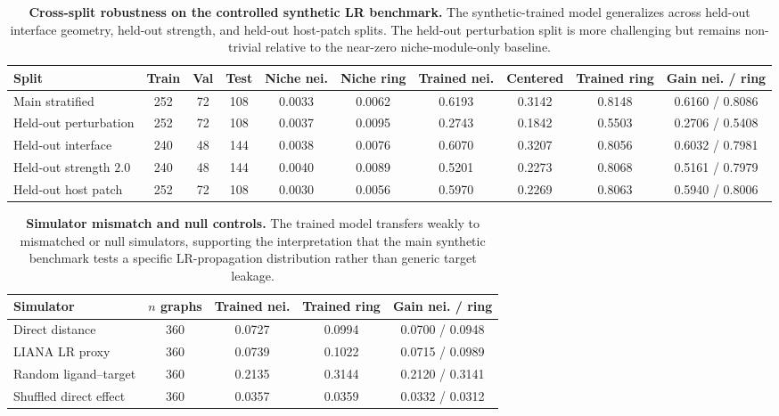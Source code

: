 \documentclass[sigconf,anonymous,review]{acmart}
\begin{document}
\begin{table}[t]
\centering
\small
\setlength{\tabcolsep}{4pt}
\renewcommand{\arraystretch}{1.08}
\caption{\textbf{Cross-split robustness on the controlled synthetic LR benchmark.}
The synthetic-trained model generalizes across held-out interface geometry, held-out
strength, and held-out host-patch splits. The held-out perturbation split is more
challenging but remains non-trivial relative to the near-zero niche-module-only baseline.}
\label{tab:synthetic_lr_cross_split}
\begin{tabular}{lccccccccc}
\toprule
Split & Train & Val & Test & Niche nei. & Niche ring & Trained nei. & Centered & Trained ring & Gain nei. / ring \\
\midrule
Main stratified & 252 & 72 & 108 & 0.0033 & 0.0062 & 0.6193 & 0.3142 & 0.8148 & 0.6160 / 0.8086 \\
Held-out perturbation & 252 & 72 & 108 & 0.0037 & 0.0095 & 0.2743 & 0.1842 & 0.5503 & 0.2706 / 0.5408 \\
Held-out interface & 240 & 48 & 144 & 0.0038 & 0.0076 & 0.6070 & 0.3207 & 0.8056 & 0.6032 / 0.7981 \\
Held-out strength $2.0$ & 240 & 48 & 144 & 0.0040 & 0.0089 & 0.5201 & 0.2273 & 0.8068 & 0.5161 / 0.7979 \\
Held-out host patch & 252 & 72 & 108 & 0.0030 & 0.0056 & 0.5970 & 0.2269 & 0.8063 & 0.5940 / 0.8006 \\
\bottomrule
\end{tabular}
\end{table}

\begin{table}[t]
\centering
\small
\setlength{\tabcolsep}{5pt}
\renewcommand{\arraystretch}{1.08}
\caption{\textbf{Simulator mismatch and null controls.}
The trained model transfers weakly to mismatched or null simulators, supporting the
interpretation that the main synthetic benchmark tests a specific LR-propagation
distribution rather than generic target leakage.}
\label{tab:synthetic_lr_mismatch_null}
\begin{tabular}{lcccc}
\toprule
Simulator & $n$ graphs & Trained nei. & Trained ring & Gain nei. / ring \\
\midrule
Direct distance & 360 & 0.0727 & 0.0994 & 0.0700 / 0.0948 \\
LIANA LR proxy & 360 & 0.0739 & 0.1022 & 0.0715 / 0.0989 \\
Random ligand--target & 360 & 0.2135 & 0.3144 & 0.2120 / 0.3141 \\
Shuffled direct effect & 360 & 0.0357 & 0.0359 & 0.0332 / 0.0312 \\
\bottomrule
\end{tabular}
\end{table}
\end{document}

